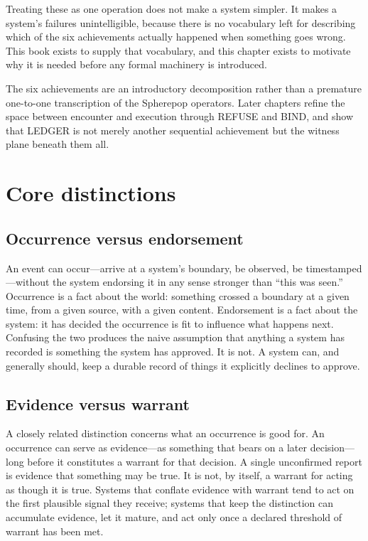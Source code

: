 \documentclass[11pt,openany]{book}
\begin{document}
Treating these as one operation does not make a system simpler. It makes a
system's failures unintelligible, because there is no vocabulary left for
describing which of the six achievements actually happened when something
goes wrong. This book exists to supply that vocabulary, and this chapter
exists to motivate why it is needed before any formal machinery is introduced.

The six achievements are an introductory decomposition rather than a premature
one-to-one transcription of the Spherepop operators. Later chapters refine the
space between encounter and execution through REFUSE and BIND, and show that
LEDGER is not merely another sequential achievement but the witness plane
beneath them all.

\section{Core distinctions}

\subsection{Occurrence versus endorsement}

An event can occur---arrive at a system's boundary, be observed, be
timestamped---without the system endorsing it in any sense stronger than
``this was seen.'' Occurrence is a fact about the world: something crossed a
boundary at a given time, from a given source, with a given content.
Endorsement is a fact about the system: it has decided the occurrence is fit to
influence what happens next. Confusing the two produces the naive assumption
that anything a system has recorded is something the system has approved. It
is not. A system can, and generally should, keep a durable record of things it
explicitly declines to approve.

\subsection{Evidence versus warrant}

A closely related distinction concerns what an occurrence is good for. An
occurrence can serve as evidence---as something that bears on a later
decision---long before it constitutes a warrant for that decision. A single
unconfirmed report is evidence that something may be true. It is not, by
itself, a warrant for acting as though it is true. Systems that conflate
evidence with warrant tend to act on the first plausible signal they receive;
systems that keep the distinction can accumulate evidence, let it mature, and
act only once a declared threshold of warrant has been met.
\end{document}
